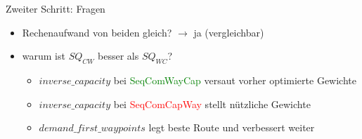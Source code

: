 \documentclass[aspectratio=169,10pt]{beamer}
\begin{document}
\begin{frame}{Zweiter Schritt: Fragen}
\Large
\begin{itemize}
    \item Rechenaufwand von beiden gleich? $\rightarrow$ ja (vergleichbar)
    \item warum ist $SQ_{CW}$ besser als $SQ_{WC}$?
    \begin{itemize}
    \Large
        \item $inverse\_capacity$ bei \textcolor{green}{SeqComWayCap} versaut vorher optimierte Gewichte
        \item $inverse\_capacity$ bei \textcolor{red}{SeqComCapWay} stellt n\"utzliche Gewichte
        \item $demand\_first\_waypoints$ legt beste Route und verbessert weiter
    \end{itemize}
\end{itemize}
\end{frame}

\end{document}
